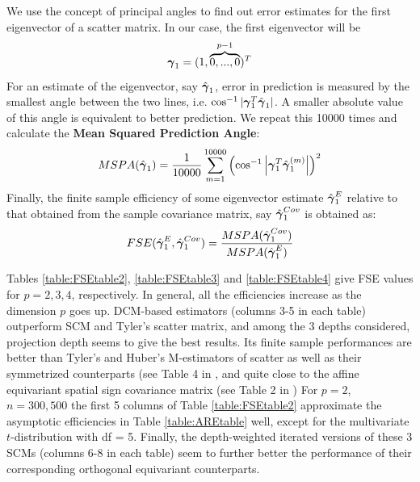 \documentclass[fleqn,11pt]{article}
\begin{document}
We use the concept of principal angles \citep{miao92} to find out error estimates for the first eigenvector of a scatter matrix. In our case, the first eigenvector will be
%
$$ {\boldsymbol{\gamma}}_1 = (1,\overbrace{0,...,0}^{p-1})^T $$
%
For an estimate of the eigenvector, say $\hat{{\boldsymbol{\gamma}}}_1$, error in prediction is measured by the smallest angle between the two lines, i.e. $ \cos^{-1} | {\boldsymbol{\gamma}}_1^T \hat{{\boldsymbol{\gamma}}}_1 | $. A smaller absolute value of this angle is equivalent to better prediction. We repeat this 10000 times and calculate the \textbf{Mean Squared Prediction Angle}:
%
$$ MSPA(\hat {{\boldsymbol{\gamma}}}_1) = \frac{1}{10000} \sum_{m=1}^{10000} \left( \cos^{-1} \left|{\boldsymbol{\gamma}}_1^T \hat{{\boldsymbol{\gamma}}}^{(m)}_1 \right| \right)^2 $$
%
Finally, the finite sample efficiency of some eigenvector estimate $\hat{{\boldsymbol{\gamma}}}^E_1$ relative to that obtained from the sample covariance matrix, say $\hat{{\boldsymbol{\gamma}}}^{Cov}_1$ is obtained as:
$$ FSE(\hat{{\boldsymbol{\gamma}}}^E_1, \hat{{\boldsymbol{\gamma}}}^{Cov}_1) = \frac{MSPA(\hat{{\boldsymbol{\gamma}}}^{Cov}_1)}{MSPA(\hat{{\boldsymbol{\gamma}}}^E_1)} $$

Tables \ref{table:FSEtable2}, \ref{table:FSEtable3} and \ref{table:FSEtable4} give FSE values for $p=2,3,4$, respectively. In general, all the efficiencies increase as the dimension $p$ goes up. DCM-based estimators (columns 3-5 in each table) outperform SCM and Tyler's scatter matrix, and among the 3 depths considered, projection depth seems to give the best results. Its finite sample performances are better than Tyler's and Huber's M-estimators of scatter as well as their symmetrized counterparts (see Table 4 in \cite{sirkia07}, and quite close to the affine equivariant spatial sign covariance matrix (see Table 2 in \cite{ollilia03}) For $p=2$, $n=300, 500$ the first 5 columns of Table \ref{table:FSEtable2} approximate the asymptotic efficiencies in Table \ref{table:AREtable} well, except for the multivariate $t$-distribution with df = 5. Finally, the depth-weighted iterated versions of these 3 SCMs (columns 6-8 in each table) seem to further better the performance of their corresponding orthogonal equivariant counterparts.
\end{document}
